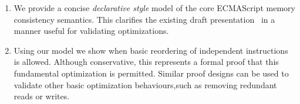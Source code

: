     \begin{enumerate}
        \item We provide a concise \textit{declarative style} model of the core ECMAScript memory consistency semantics. This clarifies the existing draft presentation~\cite{ECMA} in a manner useful for validating optimizations.
        \item Using our model we show when basic reordering of independent instructions is allowed. Although conservative, this represents a formal proof that this fundamental optimization is permitted. Similar proof designs can be used to validate other basic optimization behaviours,such as removing redundant reads or writes.
    \end{enumerate}
  